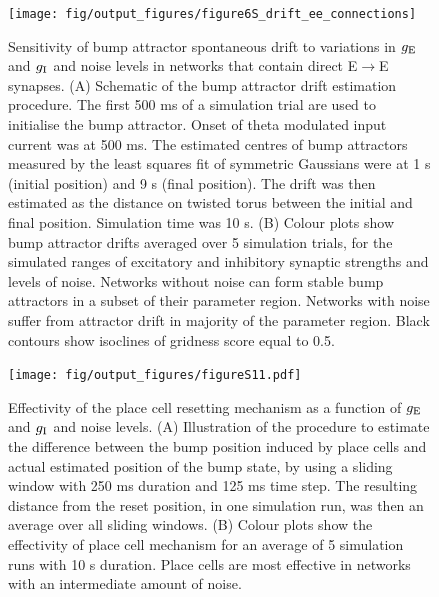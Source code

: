 \documentclass[a4paper,12pt]{article}
\newcommand{\ssc}[3]{\ensuremath{#1_{\text{#2}_{\text{#3}}}}}
\newcommand{\gE      }{\ssc{g}      {\scriptsize{E}}{}}
\newcommand{\gI      }{\ssc{g}      {\scriptsize{I}}{}}
\begin{document}
\clearpage

\begin{figure}[ht!]
    \internallinenumbers
    \centering
        \texttt{[image: fig/output\_figures/figure6S\_drift\_ee\_connections]}
    \caption{Sensitivity of bump attractor spontaneous drift to variations in
    $\gE$ and $\gI$ and noise levels in networks that contain direct
    E$\rightarrow$E synapses. (A) Schematic of the bump attractor drift
    estimation procedure. The first 500 ms of a simulation trial are used to
    initialise the bump attractor. Onset of theta modulated input current was
    at 500 ms.  The estimated centres of bump attractors measured by the least
    squares fit of symmetric Gaussians were at 1 s (initial position) and 9 s
    (final position). The drift was then estimated as the distance on twisted
    torus between the initial and final position. Simulation time was 10 s. (B)
    Colour plots show bump attractor drifts averaged over 5 simulation trials,
    for the simulated ranges of excitatory and inhibitory synaptic strengths
    and levels of noise.  Networks without noise can form stable bump
    attractors in a subset of their parameter region. Networks with noise
    suffer from attractor drift in majority of the parameter region. Black
    contours show isoclines of gridness score equal to 0.5.}
\end{figure}

\clearpage

\begin{figure}[ht!]
    \internallinenumbers
    \centering
        \texttt{[image: fig/output\_figures/figureS11.pdf]}
    \caption{Effectivity of the place cell resetting mechanism as a function of
    $\gE$ and $\gI$ and noise levels. (A) Illustration of the procedure to
    estimate the difference between the bump position induced by place cells
    and actual estimated position of the bump state, by using a sliding window
    with 250 ms duration and 125 ms time step. The resulting distance from the
    reset position, in one simulation run, was then an average over all sliding
    windows. (B) Colour plots show the effectivity of place cell mechanism for
    an average of 5 simulation runs with 10 s duration. Place cells are most
    effective in networks with an intermediate amount of noise.}
    \label{fig:S_pc_effectivity}
\end{figure}

\clearpage
\end{document}
